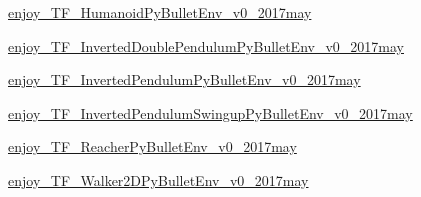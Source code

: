 \begin{DoxyCompactItemize}
\item 
 \hyperlink{namespacepybullet-gym_1_1pybulletgym_1_1examples_1_1roboschool-weights_1_1enjoy___t_f___humanoid_py_bullet_env__v0__2017may}{enjoy\+\_\+\+T\+F\+\_\+\+Humanoid\+Py\+Bullet\+Env\+\_\+v0\+\_\+2017may}
\item 
 \hyperlink{namespacepybullet-gym_1_1pybulletgym_1_1examples_1_1roboschool-weights_1_1enjoy___t_f___inverted4815cf8a7bea8454ae92c5ac92dac9b4}{enjoy\+\_\+\+T\+F\+\_\+\+Inverted\+Double\+Pendulum\+Py\+Bullet\+Env\+\_\+v0\+\_\+2017may}
\item 
 \hyperlink{namespacepybullet-gym_1_1pybulletgym_1_1examples_1_1roboschool-weights_1_1enjoy___t_f___inverted9d6b81a55deda3e52174841fe13ce955}{enjoy\+\_\+\+T\+F\+\_\+\+Inverted\+Pendulum\+Py\+Bullet\+Env\+\_\+v0\+\_\+2017may}
\item 
 \hyperlink{namespacepybullet-gym_1_1pybulletgym_1_1examples_1_1roboschool-weights_1_1enjoy___t_f___inverted49df41add915758d6f92d022ad22e9f0}{enjoy\+\_\+\+T\+F\+\_\+\+Inverted\+Pendulum\+Swingup\+Py\+Bullet\+Env\+\_\+v0\+\_\+2017may}
\item 
 \hyperlink{namespacepybullet-gym_1_1pybulletgym_1_1examples_1_1roboschool-weights_1_1enjoy___t_f___reacher_py_bullet_env__v0__2017may}{enjoy\+\_\+\+T\+F\+\_\+\+Reacher\+Py\+Bullet\+Env\+\_\+v0\+\_\+2017may}
\item 
 \hyperlink{namespacepybullet-gym_1_1pybulletgym_1_1examples_1_1roboschool-weights_1_1enjoy___t_f___walker2_d_py_bullet_env__v0__2017may}{enjoy\+\_\+\+T\+F\+\_\+\+Walker2\+D\+Py\+Bullet\+Env\+\_\+v0\+\_\+2017may}
\end{DoxyCompactItemize}
